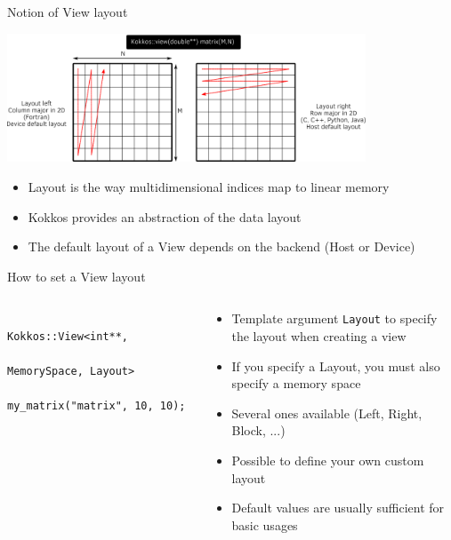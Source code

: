 \documentclass[
    aspectratio=169,
    handout,
]{beamer}
\begin{document}

\begin{frame}{Notion of View layout}
    \begin{center}
        \includegraphics[width=0.8\textwidth]{layout_right_left.png}
    \end{center}
    \begin{itemize}
        \item Layout is the way multidimensional indices map to linear memory
        \item Kokkos provides an abstraction of the data layout
        \item The default layout of a View depends on the backend (Host or Device)
    \end{itemize}
\end{frame}


\begin{frame}[fragile]{How to set a View layout}
    \begin{columns}
        \begin{column}{0.5\linewidth}
            \begin{verbatim}
                Kokkos::View<int**,
                  MemorySpace, Layout>
                    my_matrix("matrix", 10, 10);
            \end{verbatim}
        \end{column}
        \begin{column}{0.5\linewidth}
            \begin{itemize}
                \item Template argument \texttt{Layout} to specify the layout when creating a view
                \item If you specify a Layout, you must also specify a memory space
                \item Several ones available (Left, Right, Block, ...)
                \item Possible to define your own custom layout
                \item Default values are usually sufficient for basic usages
            \end{itemize}
        \end{column}
    \end{columns}
\end{frame}
\end{document}
